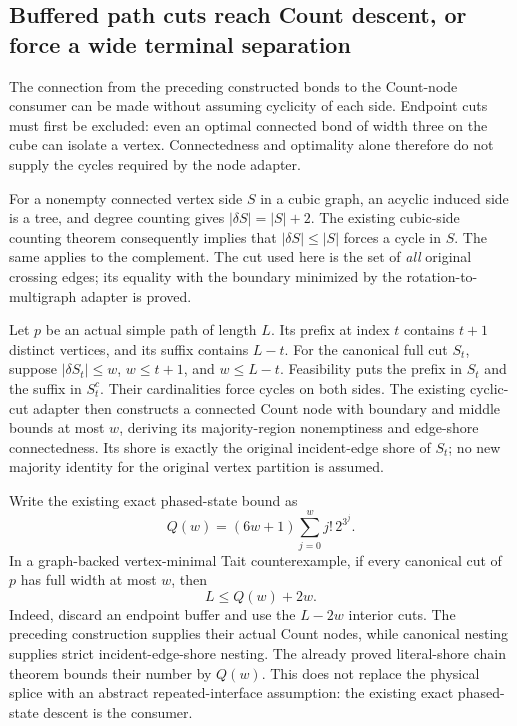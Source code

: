 \subsection{Buffered path cuts reach Count descent, or force a wide terminal separation}
\label{sec:path-count-sweep}

The connection from the preceding constructed bonds to the Count-node
consumer can be made without assuming cyclicity of each side. Endpoint
cuts must first be excluded: even an optimal connected bond of width
three on the cube can isolate a vertex. Connectedness and optimality
alone therefore do not supply the cycles required by the node adapter.

For a nonempty connected vertex side $S$ in a cubic graph, an acyclic
induced side is a tree, and degree counting gives
$|\delta S|=|S|+2$. The existing cubic-side counting theorem consequently
implies that $|\delta S|\leq |S|$ forces a cycle in $S$. The same applies
to the complement. The cut used here is the set of \emph{all} original
crossing edges; its equality with the boundary minimized by the
rotation-to-multigraph adapter is proved.

Let $p$ be an actual simple path of length $L$. Its prefix at index $t$
contains $t+1$ distinct vertices, and its suffix contains $L-t$.
For the canonical full cut $S_t$, suppose $|\delta S_t|\leq w$,
$w\leq t+1$, and $w\leq L-t$. Feasibility puts the prefix in $S_t$
and the suffix in $S_t^c$. Their cardinalities force cycles on both
sides. The existing cyclic-cut adapter then constructs a connected
Count node with boundary and middle bounds at most $w$, deriving its
majority-region nonemptiness and edge-shore connectedness. Its shore
is exactly the original incident-edge shore of $S_t$; no new majority
identity for the original vertex partition is assumed.

Write the existing exact phased-state bound as
\[
 Q(w)=(6w+1)\sum_{j=0}^{w} j!\,2^{3^j}.
\]
In a graph-backed vertex-minimal Tait counterexample, if every canonical
cut of $p$ has full width at most $w$, then
\[
 L\leq Q(w)+2w.
\]
Indeed, discard an endpoint buffer and use the $L-2w$ interior cuts.
The preceding construction supplies their actual Count nodes, while
canonical nesting supplies strict incident-edge-shore nesting. The
already proved literal-shore chain theorem bounds their number by
$Q(w)$. This does not replace the physical splice with an abstract
repeated-interface assumption: the existing exact phased-state
descent is the consumer.

